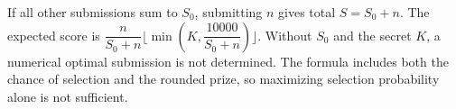 If all other submissions sum to $S_0$, submitting $n$ gives total $S=S_0+n$. The expected score is $\boxed{\dfrac{n}{S_0+n}\lfloor\min(K,\dfrac{10000}{S_0+n})\rfloor}$. Without $S_0$ and the secret $K$, a numerical optimal submission is not determined. The formula includes both the chance of selection and the rounded prize, so maximizing selection probability alone is not sufficient.
